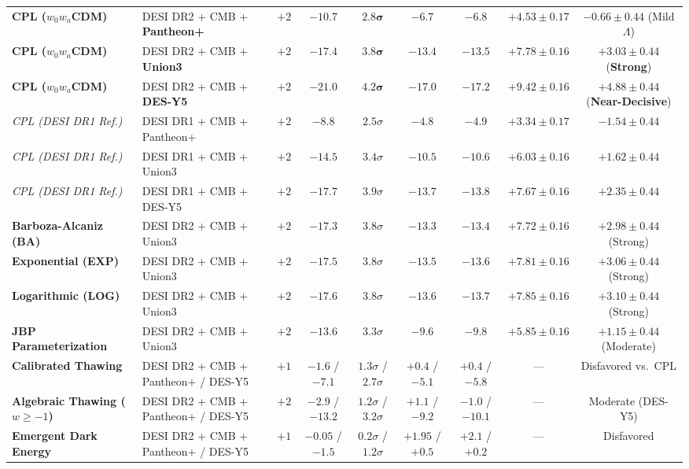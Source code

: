 \documentclass[11pt,letterpaper]{article}
\begin{document}
\begin{table}[!htbp]
{\begin{tabular}{llccccccc}
\midrule
\textbf{CPL ($w_0 w_a$CDM)} & DESI DR2 + CMB + \textbf{Pantheon+} & $+2$ & $-10.7$ & $\mathbf{2.8}\boldsymbol{\sigma}$ & $-6.7$ & $-6.8$ & $+4.53 \pm 0.17$ & $-0.66 \pm 0.44$ (Mild $\Lambda$) \\
\textbf{CPL ($w_0 w_a$CDM)} & DESI DR2 + CMB + \textbf{Union3} & $+2$ & $-17.4$ & $\mathbf{3.8}\boldsymbol{\sigma}$ & $-13.4$ & $-13.5$ & $+7.78 \pm 0.16$ & $\mathbf{+3.03 \pm 0.44}$ (\textbf{Strong}) \\
\textbf{CPL ($w_0 w_a$CDM)} & DESI DR2 + CMB + \textbf{DES-Y5} & $+2$ & $-21.0$ & $\mathbf{4.2}\boldsymbol{\sigma}$ & $-17.0$ & $-17.2$ & $+9.42 \pm 0.16$ & $\mathbf{+4.88 \pm 0.44}$ (\textbf{Near-Decisive}) \\
\midrule
\emph{CPL (DESI DR1 Ref.)} & DESI DR1 + CMB + Pantheon+ & $+2$ & $-8.8$ & $2.5\sigma$ & $-4.8$ & $-4.9$ & $+3.34 \pm 0.17$ & $-1.54 \pm 0.44$ \\
\emph{CPL (DESI DR1 Ref.)} & DESI DR1 + CMB + Union3 & $+2$ & $-14.5$ & $3.4\sigma$ & $-10.5$ & $-10.6$ & $+6.03 \pm 0.16$ & $+1.62 \pm 0.44$ \\
\emph{CPL (DESI DR1 Ref.)} & DESI DR1 + CMB + DES-Y5 & $+2$ & $-17.7$ & $3.9\sigma$ & $-13.7$ & $-13.8$ & $+7.67 \pm 0.16$ & $+2.35 \pm 0.44$ \\
\midrule
\textbf{Barboza-Alcaniz (BA)} & DESI DR2 + CMB + Union3 & $+2$ & $-17.3$ & $3.8\sigma$ & $-13.3$ & $-13.4$ & $+7.72 \pm 0.16$ & $+2.98 \pm 0.44$ (Strong) \\
\textbf{Exponential (EXP)} & DESI DR2 + CMB + Union3 & $+2$ & $-17.5$ & $3.8\sigma$ & $-13.5$ & $-13.6$ & $+7.81 \pm 0.16$ & $+3.06 \pm 0.44$ (Strong) \\
\textbf{Logarithmic (LOG)} & DESI DR2 + CMB + Union3 & $+2$ & $-17.6$ & $3.8\sigma$ & $-13.6$ & $-13.7$ & $+7.85 \pm 0.16$ & $+3.10 \pm 0.44$ (Strong) \\
\textbf{JBP Parameterization} & DESI DR2 + CMB + Union3 & $+2$ & $-13.6$ & $3.3\sigma$ & $-9.6$ & $-9.8$ & $+5.85 \pm 0.16$ & $+1.15 \pm 0.44$ (Moderate) \\
\midrule
\textbf{Calibrated Thawing} & DESI DR2 + CMB + Pantheon+ / DES-Y5 & $+1$ & $-1.6$ / $-7.1$ & $1.3\sigma$ / $2.7\sigma$ & $+0.4$ / $-5.1$ & $+0.4$ / $-5.8$ & --- & Disfavored vs.\ CPL \\
\textbf{Algebraic Thawing ($w\ge -1$)} & DESI DR2 + CMB + Pantheon+ / DES-Y5 & $+2$ & $-2.9$ / $-13.2$ & $1.2\sigma$ / $3.2\sigma$ & $+1.1$ / $-9.2$ & $-1.0$ / $-10.1$ & --- & Moderate (DES-Y5) \\
\textbf{Emergent Dark Energy} & DESI DR2 + CMB + Pantheon+ / DES-Y5 & $+1$ & $-0.05$ / $-1.5$ & $0.2\sigma$ / $1.2\sigma$ & $+1.95$ / $+0.5$ & $+2.1$ / $+0.2$ & --- & Disfavored \\

\end{tabular}}
\end{table}
\end{document}
